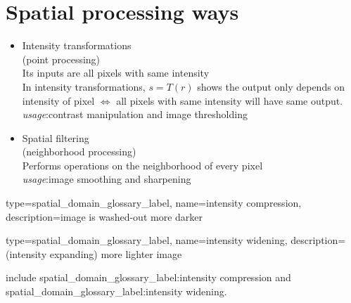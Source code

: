 \section{Spatial processing ways}

\begin{itemize}
\item
  Intensity transformations\\
  (point processing)\\
  Its inputs are all pixels with same intensity\\
  In intensity transformations, $s=T(r)$ shows the output only depends on
  intensity of pixel $\Leftrightarrow$  all pixels with same intensity will have
  same output.\\
  \emph{usage}:contrast manipulation and image thresholding
\item
  Spatial ﬁltering\\
  (neighborhood processing)\\
  Performs operations on the neighborhood of every pixel\\
  \emph{usage}:image smoothing and sharpening
\end{itemize}

{
type={spatial_domain_glossary_label},
name={intensity compression},
description={image is washed-out more darker}}

{
type={spatial_domain_glossary_label},
name={intensity widening},
description={(intensity expanding) more lighter image}}


include \gls{spatial_domain_glossary_label:intensity compression} and \gls{spatial_domain_glossary_label:intensity widening}.
 
\printglossary[type=spatial_domain_glossary_label]
